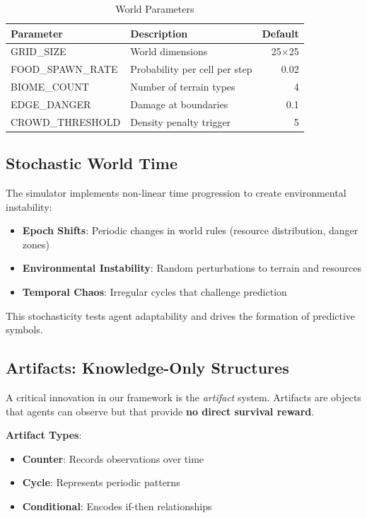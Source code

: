 \documentclass[11pt,a4paper]{article}
\begin{document}
\begin{table}[htbp]
\centering
\caption{World Parameters}
\label{tab:world}
\begin{tabular}{@{}llr@{}}
\toprule
\textbf{Parameter} & \textbf{Description} & \textbf{Default} \\
\midrule
GRID\_SIZE & World dimensions & 25$\times$25 \\
FOOD\_SPAWN\_RATE & Probability per cell per step & 0.02 \\
BIOME\_COUNT & Number of terrain types & 4 \\
EDGE\_DANGER & Damage at boundaries & 0.1 \\
CROWD\_THRESHOLD & Density penalty trigger & 5 \\
\bottomrule
\end{tabular}
\end{table}

\subsection{Stochastic World Time}

The simulator implements non-linear time progression to create environmental instability:

\begin{itemize}
    \item \textbf{Epoch Shifts}: Periodic changes in world rules (resource distribution, danger zones)
    \item \textbf{Environmental Instability}: Random perturbations to terrain and resources
    \item \textbf{Temporal Chaos}: Irregular cycles that challenge prediction
\end{itemize}

This stochasticity tests agent adaptability and drives the formation of predictive symbols.

\subsection{Artifacts: Knowledge-Only Structures}

A critical innovation in our framework is the \textit{artifact} system. Artifacts are objects that agents can observe but that provide \textbf{no direct survival reward}.

\textbf{Artifact Types}:
\begin{itemize}
    \item \textbf{Counter}: Records observations over time
    \item \textbf{Cycle}: Represents periodic patterns
    \item \textbf{Conditional}: Encodes if-then relationships
\end{itemize}
\end{document}
